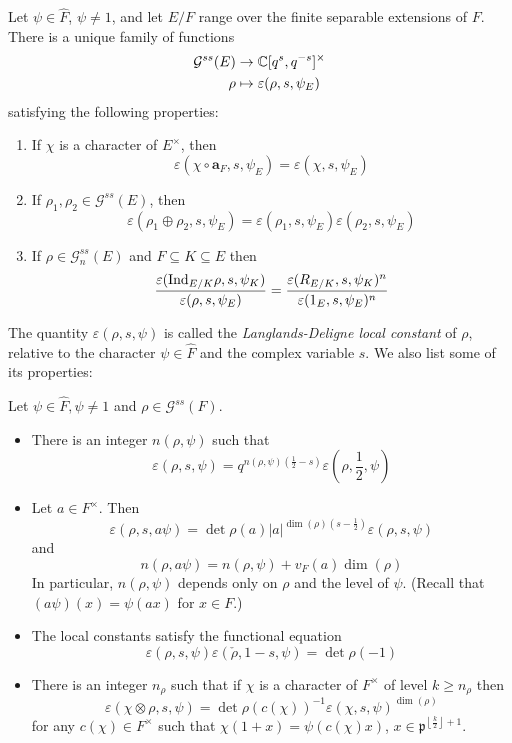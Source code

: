 \begin{thm}
	Let $\psi\in \widehat{F}$, $\psi\not=1$, and let $E/F$ range over the finite separable extensions of $F$. There is a unique family of functions
	\begin{align*}
		\mathcal{G}^{ss}(E)&\to \mathbb{C}[q^s, q^{-s}]^\times\\
		\rho &\mapsto \varepsilon(\rho, s, \psi_E)
	\end{align*}
	satisfying the following properties:
	\begin{enumerate}
		\item If $\chi$ is a character of $E^\times$, then
		\[\varepsilon(\chi\circ \mathbf{a}_F, s, \psi_E) = \varepsilon(\chi, s, \psi_E)\]
		\item If $\rho_1, \rho_2\in \mathcal{G}^{ss}(E)$, then
		\[\varepsilon(\rho_1\oplus \rho_2, s, \psi_E) = \varepsilon(\rho_1, s, \psi_E)\varepsilon(\rho_2, s, \psi_E)\] 
		\item If $\rho \in \mathcal{G}^{ss}_n(E)$ and $F\subseteq K\subseteq E$ then
		\[\frac{\varepsilon(\mathrm{Ind}_{E/K}\rho, s, \psi_K)}{\varepsilon(\rho, s, \psi_E)} = \frac{\varepsilon(R_{E/K}, s, \psi_K)^n}{\varepsilon(1_E, s, \psi_E)^n}\]
	\end{enumerate}
\end{thm}
The quantity $\varepsilon(\rho, s, \psi)$ is called the \emph{Langlands-Deligne local constant} of $\rho$, relative to the character $\psi\in \widehat{F}$ and the complex variable $s$. We also list some of its properties:

\begin{prop}
	Let $\psi\in \widehat{F}, \psi\not=1$ and $\rho \in \mathcal{G}^{ss}(F)$. 
	\begin{itemize}
		\item There is an integer $n(\rho, \psi)$ such that
		\[\varepsilon(\rho, s, \psi) = q^{n(\rho, \psi)(\frac{1}{2}-s)}\varepsilon\left(\rho, \frac{1}{2}, \psi\right)\]
		\item Let $a\in F^\times$. Then
		\[\varepsilon(\rho, s, a\psi) = \det \rho(a) |a|^{\dim(\rho)(s-\frac{1}{2})}\varepsilon(\rho, s, \psi)\]
		and
		\[n(\rho, a\psi) = n(\rho, \psi) + v_F(a)\dim(\rho)\]
		In particular, $n(\rho, \psi)$ depends only on $\rho$ and the level of $\psi$. (Recall that $(a\psi)(x) = \psi(ax)$ for $x\in F$.)
		\item The local constants satisfy the functional equation 
		\[\varepsilon(\rho, s, \psi)\varepsilon(\check{\rho}, 1-s, \psi) = \det \rho(-1)\]
		\item There is an integer $n_\rho$ such that if $\chi$ is a character of $F^\times$ of level $k\ge n_\rho$ then 
		\[\varepsilon(\chi\otimes \rho, s, \psi) = \det \rho(c(\chi))^{-1}\varepsilon(\chi, s, \psi)^{\dim(\rho)}\]
		for any $c(\chi)\in F^\times$ such that $\chi(1 + x) = \psi(c(\chi)x)$, $x\in \mathfrak{p}^{\left\lfloor \frac{k}{2}\right\rfloor+1}$.
	\end{itemize}
\end{prop}
